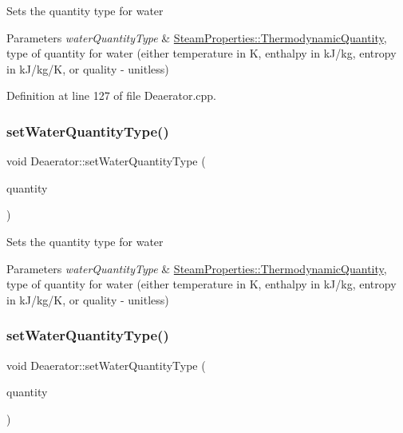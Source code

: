 Sets the quantity type for water 
\begin{DoxyParams}{Parameters}
{\em water\+Quantity\+Type} & \hyperlink{class_steam_properties_ae0294bedf7d178c2d8fb6aed0f62fbff}{Steam\+Properties\+::\+Thermodynamic\+Quantity}, type of quantity for water (either temperature in K, enthalpy in k\+J/kg, entropy in k\+J/kg/K, or quality -\/ unitless) \\
\hline
\end{DoxyParams}


Definition at line 127 of file Deaerator.\+cpp.

\mbox{\label{class_deaerator_ac60ad3d6650ed6c7783d18833bb7e3dd}} 
\subsubsection{\texorpdfstring{set\+Water\+Quantity\+Type()}{setWaterQuantityType()}\hspace{0.1cm}{\footnotesize\ttfamily [2/3]}}
{\footnotesize\ttfamily void Deaerator\+::set\+Water\+Quantity\+Type (\begin{DoxyParamCaption}\item[{\hyperlink{class_steam_properties_ae0294bedf7d178c2d8fb6aed0f62fbff}{Steam\+Properties\+::\+Thermodynamic\+Quantity}}]{quantity }\end{DoxyParamCaption})}

Sets the quantity type for water 
\begin{DoxyParams}{Parameters}
{\em water\+Quantity\+Type} & \hyperlink{class_steam_properties_ae0294bedf7d178c2d8fb6aed0f62fbff}{Steam\+Properties\+::\+Thermodynamic\+Quantity}, type of quantity for water (either temperature in K, enthalpy in k\+J/kg, entropy in k\+J/kg/K, or quality -\/ unitless) \\
\hline
\end{DoxyParams}
\mbox{\label{class_deaerator_ac60ad3d6650ed6c7783d18833bb7e3dd}} 
\subsubsection{\texorpdfstring{set\+Water\+Quantity\+Type()}{setWaterQuantityType()}\hspace{0.1cm}{\footnotesize\ttfamily [3/3]}}
{\footnotesize\ttfamily void Deaerator\+::set\+Water\+Quantity\+Type (\begin{DoxyParamCaption}\item[{\hyperlink{class_steam_properties_ae0294bedf7d178c2d8fb6aed0f62fbff}{Steam\+Properties\+::\+Thermodynamic\+Quantity}}]{quantity }\end{DoxyParamCaption})}

